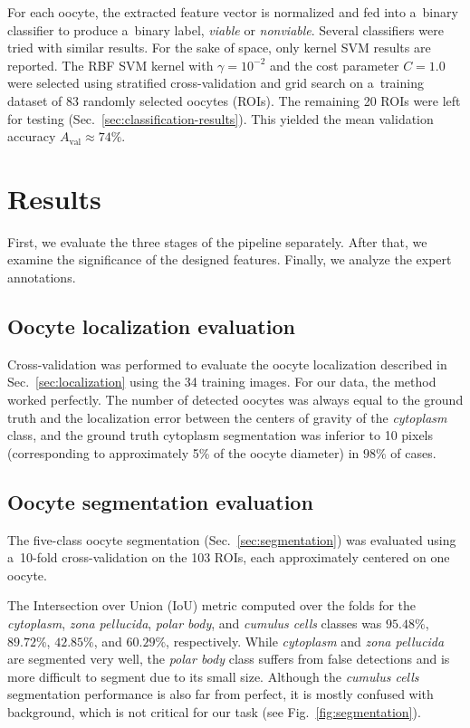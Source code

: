\documentclass[]{spie}  %
\begin{document}
For each oocyte, the extracted feature vector is normalized and fed into
a~binary classifier to produce a~binary label, \textit{viable} or
\textit{nonviable}. Several classifiers were tried with similar results. For the sake of space, only kernel SVM results are reported. 
The RBF SVM kernel with $\gamma = 10^{-2}$ and the cost parameter ${C=1.0}$ were
selected using stratified cross-validation and grid search on a~training dataset of 83
randomly selected oocytes (ROIs). The remaining 20 ROIs were left for testing (Sec.~\ref{sec:classification-results}). This yielded the mean validation accuracy $A_{\text{val}} \approx74\%$.

\section{Results}

First, we evaluate the three stages of the pipeline separately. After that, we examine the significance of the designed features. Finally, we analyze the expert annotations.

\subsection{Oocyte localization evaluation}
\label{sec:localization-results}

Cross-validation was performed to evaluate the oocyte localization
described in Sec.~\ref{sec:localization} using the 34 training images. For
our data, the method worked perfectly. The number of detected oocytes was always
equal to the ground truth and the localization error between the centers of
gravity of the \textit{cytoplasm} class, and the ground truth cytoplasm segmentation
was inferior to 10 pixels (corresponding to approximately 5\% of the oocyte
diameter) in $98\%$ of cases.

\subsection{Oocyte segmentation evaluation}

The five-class oocyte segmentation (Sec.~\ref{sec:segmentation}) was
evaluated using a~10-fold cross-validation on the 103 ROIs, each approximately
centered on one oocyte. 

The Intersection over Union (IoU) metric computed over the folds for the
\textit{cytoplasm}, \textit{zona pellucida}, \textit{polar body}, and \textit{cumulus cells} classes was $95.48\%$,
$89.72\%$, $42.85\%$, and $60.29\%$, respectively.  While \textit{cytoplasm} and
\textit{zona pellucida} are segmented very well, the \textit{polar body} class suffers from false
detections and is more difficult to segment due to its small size.  Although
the \textit{cumulus cells} segmentation performance is also far from perfect, it
is mostly confused with background, which is not critical for our
task (see Fig.~\ref{fig:segmentation}).
\end{document}
